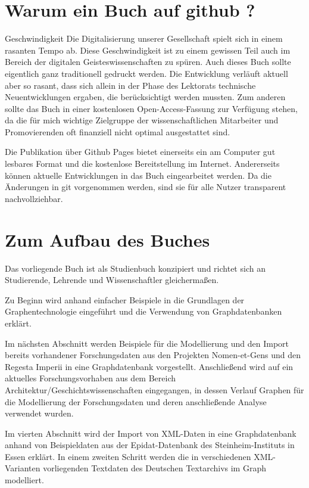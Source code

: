 \documentclass[ngerman,]{scrreprt}
\begin{document}
\section{Warum ein Buch auf github ?}\label{warum-ein-buch-auf-github}

Geschwindigkeit Die Digitalisierung unserer Gesellschaft spielt sich in einem rasanten Tempo ab. Diese Geschwindigkeit ist zu einem gewissen Teil auch im Bereich der digitalen Geisteswissenschaften zu spüren. Auch dieses Buch sollte eigentlich ganz traditionell gedruckt werden. Die Entwicklung verläuft aktuell aber so rasant, dass sich allein in der Phase des Lektorats technische Neuentwicklungen ergaben, die berücksichtigt werden mussten. Zum anderen sollte das Buch in einer kostenlosen Open-Access-Fassung zur Verfügung stehen, da die für mich wichtige Zielgruppe der wissenschaftlichen Mitarbeiter und Promovierenden oft finanziell nicht optimal ausgestattet sind.

Die Publikation über Github Pages bietet einerseits ein am Computer gut lesbares Format und die kostenlose Bereitstellung im Internet. Andererseits können aktuelle Entwicklungen in das Buch eingearbeitet werden. Da die Änderungen in git vorgenommen werden, sind sie für alle Nutzer transparent nachvollziehbar.

\section{Zum Aufbau des Buches}\label{zum-aufbau-des-buches}

Das vorliegende Buch ist als Studienbuch konzipiert und richtet sich an Studierende, Lehrende und Wissenschaftler gleichermaßen.

Zu Beginn wird anhand einfacher Beispiele in die Grundlagen der Graphentechnologie eingeführt und die Verwendung von Graphdatenbanken erklärt.

Im nächsten Abschnitt werden Beispiele für die Modellierung und den Import bereits vorhandener Forschungsdaten aus den Projekten Nomen-et-Gens und den Regesta Imperii in eine Graphdatenbank vorgestellt. Anschließend wird auf ein aktuelles Forschungsvorhaben aus dem Bereich Architektur/Geschichtswissenschaften eingegangen, in dessen Verlauf Graphen für die Modellierung der Forschungsdaten und deren anschließende Analyse verwendet wurden.

Im vierten Abschnitt wird der Import von XML-Daten in eine Graphdatenbank anhand von Beispieldaten aus der Epidat-Datenbank des Steinheim-Instituts in Essen erklärt. In einem zweiten Schritt werden die in verschiedenen XML-Varianten vorliegenden Textdaten des Deutschen Textarchivs im Graph modelliert.
\end{document}
